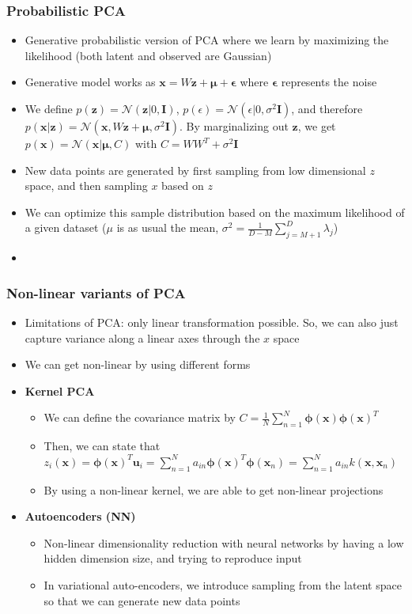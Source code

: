 \subsubsection{Probabilistic PCA}
\begin{itemize}
	\item Generative probabilistic version of PCA where we learn by maximizing the likelihood (both latent and observed are Gaussian)
	\item Generative model works as $\bm{x} = W\bm{z} + \bm{\mu} + \bm{\epsilon}$ where $\bm{\epsilon}$ represents the noise
	\item We define $p(\bm{z}) = \mathcal{N}(\bm{z}|0, \bm{I})$, $p(\epsilon) = \mathcal{N}(\epsilon|0, \sigma^2 \bm{I})$, and therefore $p(\bm{x}|\bm{z}) = \mathcal{N}(\bm{x}, W\bm{z} + \bm{\mu}, \sigma^2 \bm{I})$. By marginalizing out $\bm{z}$, we get $p(\bm{x}) = \mathcal{N}(\bm{x}|\bm{\mu}, C)$ with $C = WW^T + \sigma^2 \bm{I}$
	\item New data points are generated by first sampling from low dimensional $z$ space, and then sampling $x$ based on $z$
	\item We can optimize this sample distribution based on the maximum likelihood of a given dataset ($\mu$ is as usual the mean, $\sigma^2 = \frac{1}{D - M}\sum_{j=M+1}^{D} \lambda_j$)
	\item 
\end{itemize}
\subsubsection{Non-linear variants of PCA}
\begin{itemize}
	\item Limitations of PCA: only linear transformation possible. So, we can also just capture variance along a linear axes through the $x$ space
	\item We can get non-linear by using different forms
	\item \textbf{Kernel PCA}
	\begin{itemize}
		\item We can define the covariance matrix by $C=\frac{1}{N}\sum\limits_{n=1}^{N} \bm{\phi}(\bm{x})\bm{\phi}(\bm{x})^T$
		\item Then, we can state that $z_i(\bm{x}) = \bm{\phi}(\bm{x})^T \bm{u}_i = \sum_{n=1}^{N}a_{in}\bm{\phi}(\bm{x})^T \bm{\phi}(\bm{x}_n) =  \sum_{n=1}^{N}a_{in}k(\bm{x},\bm{x}_n)$
		\item By using a non-linear kernel, we are able to get non-linear projections
	\end{itemize}
	\item \textbf{Autoencoders (NN)}
	\begin{itemize}
		\item Non-linear dimensionality reduction with neural networks by having a low hidden dimension size, and trying to reproduce input
		\item In variational auto-encoders, we introduce sampling from the latent space so that we can generate new data points
	\end{itemize}
\end{itemize}